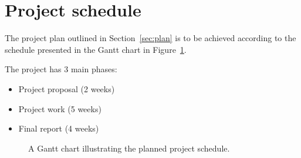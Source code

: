 \documentclass[11pt]{scrartcl}
\begin{document}
	\section{Project schedule} {
    \label{sec:schedule}

        The project plan outlined in Section~\ref{sec:plan} is to be achieved
        according to the schedule presented in the Gantt chart in
        Figure~\ref{gantt:proposal}.

        The project has 3 main phases:
        
        \begin{itemize}
        	\item Project proposal (2 weeks)
        	\item Project work (5 weeks)
        	\item Final report (4 weeks)
        \end{itemize}


		\begin{figure}[H]
	        \makebox[\textwidth][c]{\resizebox{0.95\paperwidth}{!}{}}
			\caption[Project Schedule] {
                A Gantt chart illustrating the planned project schedule.
			}
			\label{gantt:proposal}
		\end{figure}
	}
\end{document}
